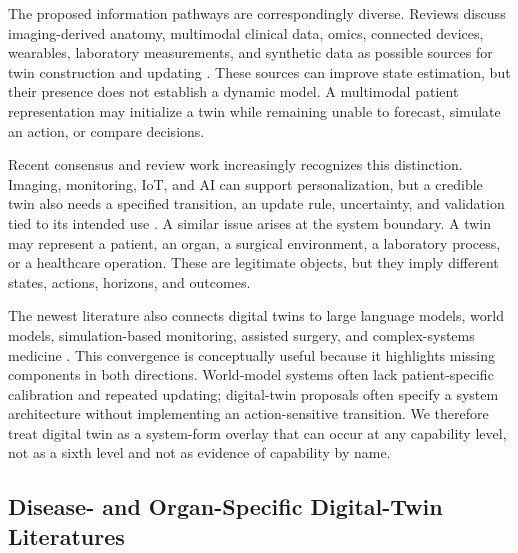 The proposed information pathways are correspondingly diverse. Reviews discuss imaging-derived anatomy, multimodal clinical data, omics, connected devices, wearables, laboratory measurements, and synthetic data as possible sources for twin construction and updating \citep{ukaniszyn2024DigitalTwinsGenerated,Papachristou2024DigitalTwinsAdvancements,Padoan2024Dynamicmirroringunveiling,Vall_e2024EnvisioningFuturePersonalized,Johnson2024DigitalTwinsHealthcare,Niarakis2024ImmuneDigitalTwins}. These sources can improve state estimation, but their presence does not establish a dynamic model. A multimodal patient representation may initialize a twin while remaining unable to forecast, simulate an action, or compare decisions.

Recent consensus and review work increasingly recognizes this distinction. Imaging, monitoring, IoT, and AI can support personalization, but a credible twin also needs a specified transition, an update rule, uncertainty, and validation tied to its intended use \citep{Iqbal2025consensusstatementon,Zhao2025Currentprogressdigital,Rudsari2025Digitaltwinshealthcare,Ooka2025EraPreemptiveMedicine,Saratkar2025Digitaltwinpersonalized,Kabir2025Digitaltwinshealthcare}. A similar issue arises at the system boundary. A twin may represent a patient, an organ, a surgical environment, a laboratory process, or a healthcare operation. These are legitimate objects, but they imply different states, actions, horizons, and outcomes.

The newest literature also connects digital twins to large language models, world models, simulation-based monitoring, assisted surgery, and complex-systems medicine \citep{Nadeem2025comprehensivereviewdigital,Sad_e2025Medicaldigitaltwins,Asciak2025Digitaltwinassisted,Domenico2025ChallengesOpportunitiesDigital,Zhou2026DigitalTwinAi,Babu2026HumanDigitalTwins}. This convergence is conceptually useful because it highlights missing components in both directions. World-model systems often lack patient-specific calibration and repeated updating; digital-twin proposals often specify a system architecture without implementing an action-sensitive transition. We therefore treat digital twin as a system-form overlay that can occur at any capability level, not as a sixth level and not as evidence of capability by name.

\subsection{Disease- and Organ-Specific Digital-Twin Literatures}


